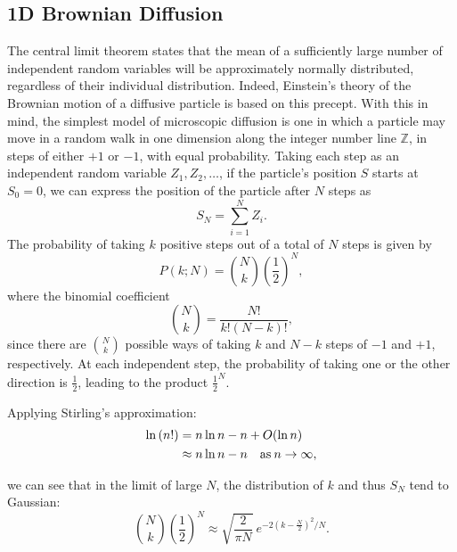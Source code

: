 	\subsection{1D Brownian Diffusion} %
	\label{sub:a_1d_random_walk_analogy}
	  The central limit theorem states that the mean of a sufficiently large number of independent random variables will be approximately normally distributed, regardless of their individual distribution. Indeed, Einstein's theory of the Brownian motion of a diffusive particle is based on this precept. With this in mind, the simplest model of microscopic diffusion is one in which a particle may move in a random walk in one dimension along the integer number line $\mathbb{Z}$, in steps of either $+1$ or $-1$, with equal probability. Taking each step as an independent random variable $Z_1, Z_2,\ldots$, if the particle's position $S$ starts at $S_0 = 0$, we can express the position of the particle after $N$ steps as
	  \begin{equation}
	    S_N = \sum\limits_{i=1}^N Z_i .
	  \end{equation}
	  The probability of taking $k$ positive steps out of a total of $N$ steps is given by
	  \begin{equation}
	    P(k;N) = \binom{N}{k}\left(\frac{1}{2} \right)^N,
	  \end{equation}
	  where the binomial coefficient
	  \begin{equation}
	    \label{eq:registration:binomial-coefficient}
	     \binom{N}{k} = \frac{N!}{k!(N-k)!},
	  \end{equation}
	  since there are $\binom{N}{k}$ possible ways of taking $k$ and $N - k$ steps of $-1$ and $+1$, respectively. At each independent step, the probability of taking one or the other direction is $\frac{1}{2}$, leading to the product $\frac{1}{2}^N$.
  
	  Applying Stirling's approximation:
	  \begin{align}
	    \label{eq:registration:stirling}
	    \ln \left( n! \right) &= n\ln n - n + O(\ln n) \notag \\
	           &\approx n\ln n - n \quad \text{as}\: n \to \infty,
	  \end{align}
  
	  we can see that in the limit of large $N$, the distribution of $k$ and thus $S_N$ tend to Gaussian:
	  \begin{equation}
	    \label{eq:registration:gaussian-approximation}
	    \binom{N}{k}\left(\frac{1}{2}\right)^N \approx \sqrt{\frac{2}{\pi N}} \
	      e^{-2(k - \frac{N}{2})^2/N}.
	  \end{equation}
  
